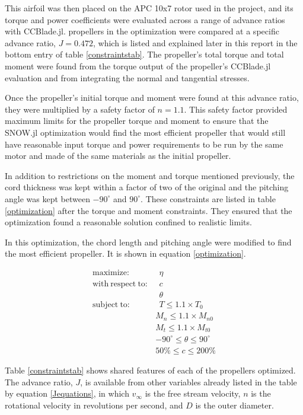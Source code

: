 \documentclass[journal ]{new-aiaa}
\begin{document}
This airfoil was then placed on the APC 10x7 rotor used in the project, and its torque and power coefficients were evaluated across a range of advance ratios with CCBlade.jl. propellers in the optimization were compared at a specific advance ratio, $J=0.472$, which is listed and explained later in this report in the bottom entry of table \ref{constraintstab}. The propeller's total torque and total moment were found from the torque output of the propeller's CCBlade.jl evaluation and from integrating the normal and tangential stresses.

Once the propeller's initial torque and moment were found at this advance ratio, they were multiplied by a safety factor of $n=1.1$. This safety factor provided maximum limits for the propeller torque and moment to ensure that the SNOW.jl optimization would find the most efficient propeller that would still have reasonable input torque and power requirements to be run by the same motor and made of the same materials as the initial propeller.

In addition to restrictions on the moment and torque mentioned previously, the cord thickness was kept within a factor of two of the original and the pitching angle was kept between $-90^{\circ}$ and $90^{\circ}$. These constraints are listed in table \ref{optimization} after the torque and moment constraints. They ensured that the optimization found a reasonable solution confined to realistic limits.

In this optimization, the chord length and pitching angle were modified to find the most efficient propeller. It is shown in equation \ref{optimization}. 

\begin{equation}
	\label{optimization}
	\begin{aligned}
		\mathrm{maximize:}& ~~ \eta \\
		\mathrm{with~respect~to:}& ~~ c \\
		& ~~ \theta \\
		\mathrm{subject~to:}& ~~ T \leq 1.1 \times T_{0} \\
		& M_{n} \leq 1.1 \times M_{n0} \\
		& M_{t} \leq 1.1 \times M_{t0} \\
		& -90^{\circ} \leq \theta \leq 90^{\circ} \\
		& 50\% \leq c \leq 200\%
	\end{aligned}
\end{equation}

Table \ref{constraintstab} shows shared features of each of the propellers optimized. The advance ratio, $J$, is available from other variables already listed in the table by equation \ref{Jequations}, in which $v_{\infty}$ is the free stream velocity, $n$ is the rotational velocity in revolutions per second, and $D$ is the outer diameter.
\end{document}
